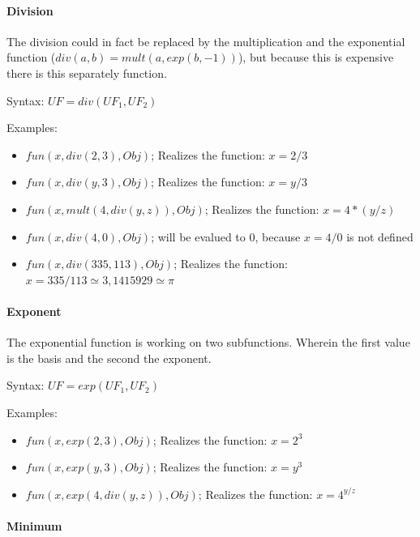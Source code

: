 \paragraph{Division}

The division could in fact be replaced by the multiplication and the exponential function ($div(a,b)=mult( a, exp(b,-1) )$), but because this is expensive there is this separately function.

\bigskip\noindent
Syntax:
$UF=div( UF_1, UF_2 )$

\bigskip\noindent
Examples:
\begin{itemize}
 \item $fun(x, div( 2, 3 ), Obj)$; Realizes the function: $x=2/3$
 \item $fun(x, div( y, 3 ), Obj)$; Realizes the function: $x=y/3$
 \item $fun(x, mult( 4, div( y, z ) ), Obj)$; Realizes the function: $x=4*(y/z)$
 \item $fun(x, div( 4, 0 ), Obj)$; will be evalued to $0$, because $x=4/0$ is not defined
 \item $fun(x, div( 335, 113 ), Obj)$; Realizes the function: $x=335/113 \simeq 3,1415929 \simeq \pi$
\end{itemize}


\paragraph{Exponent}

The exponential function is working on two subfunctions. Wherein the first value is the basis and the second the exponent.


\bigskip\noindent
Syntax:
$UF=exp( UF_1, UF_2 )$

\bigskip\noindent
Examples:
\begin{itemize}
 \item $fun(x, exp( 2, 3), Obj)$; Realizes the function: $x=2^3$
 \item $fun(x, exp( y, 3), Obj)$; Realizes the function: $x=y^3$
 \item $fun(x, exp( 4, div(y,z) ), Obj)$; Realizes the function: $x=4^{y/z}$
\end{itemize}


\paragraph{Minimum}

